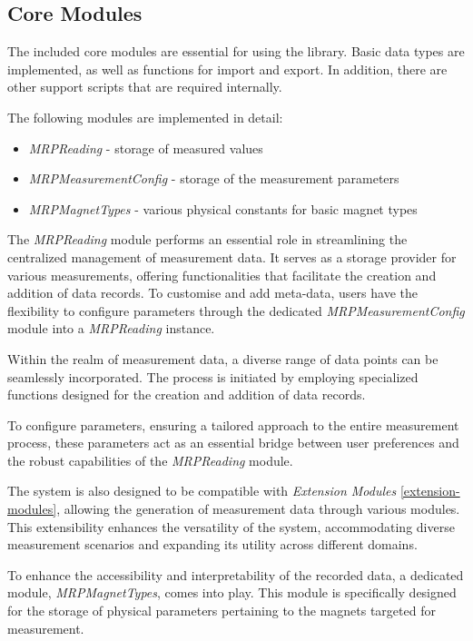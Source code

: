 \hypertarget{core-modules}{%
\subsection{Core Modules}\label{core-modules}}

The included core modules are essential for using the library. Basic
data types are implemented, as well as functions for import and export.
In addition, there are other support scripts that are required
internally.

\newpage

The following modules are implemented in detail:

\begin{itemize}
\tightlist
\item
  \emph{MRPReading} - storage of measured values
\item
  \emph{MRPMeasurementConfig} - storage of the measurement parameters
\item
  \emph{MRPMagnetTypes} - various physical constants for basic magnet
  types
\end{itemize}

The \emph{MRPReading} module performs an essential role in streamlining
the centralized management of measurement data. It serves as a storage
provider for various measurements, offering functionalities that
facilitate the creation and addition of data records. To customise and
add meta-data, users have the flexibility to configure parameters
through the dedicated \emph{MRPMeasurementConfig} module into a
\emph{MRPReading} instance.

Within the realm of measurement data, a diverse range of data points can
be seamlessly incorporated. The process is initiated by employing
specialized functions designed for the creation and addition of data
records.

To configure parameters, ensuring a tailored approach to the entire
measurement process, these parameters act as an essential bridge between
user preferences and the robust capabilities of the \emph{MRPReading}
module.

The system is also designed to be compatible with \emph{Extension
Modules} \ref{extension-modules}, allowing the generation of measurement
data through various modules. This extensibility enhances the
versatility of the system, accommodating diverse measurement scenarios
and expanding its utility across different domains.

To enhance the accessibility and interpretability of the recorded data,
a dedicated module, \emph{MRPMagnetTypes}, comes into play. This module
is specifically designed for the storage of physical parameters
pertaining to the magnets targeted for measurement.

